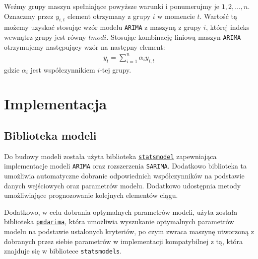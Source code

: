 \documentclass[12pt]{article}
\begin{document}
Weźmy grupy maszyn spełniające powyższe warunki i ponumerujmy je $1, 2, \dots, n$. Oznaczmy przez $y_{i,t}$ element otrzymany z grupy $i$ w momencie $t$. Wartość tą możemy uzyskać stosując wzór modelu \texttt{ARIMA} z maszyną z grupy $i$, której indeks wewnątrz grupy jest równy $t mod i$.
Stosując kombinację liniową maszyn \texttt{ARIMA} otrzymujemy następujący wzór na następny element:
\begin{gather*}
    y_t = \sum^n_{i=1}\alpha_iy_{i,t}
\end{gather*}
gdzie $\alpha_i$ jest współczynnikiem $i$-tej grupy.

\section{Implementacja}

\subsection{Biblioteka modeli}

Do budowy modeli została użyta biblioteka \href{https://www.statsmodels.org/stable/index.html}{\texttt{statsmodel}} zapewniająca implementacje modeli \texttt{ARIMA} oraz rozszerzenia \texttt{SARIMA}. Dodatkowo biblioteka ta umożliwia automatyczne dobranie odpowiednich współczynników na podstawie danych wejściowych oraz parametrów modelu. Dodatkowo udostępnia metody umożliwiające prognozowanie kolejnych elementów ciągu.

Dodatkowo, w celu dobrania optymalnych parametrów modeli, użyta została biblioteka \href{https://alkaline-ml.com/pmdarima/}{\texttt{pmdarima}}, która umożliwia wyszukanie optymalnych parametrów modelu na podstawie ustalonych kryteriów, po czym zwraca maszynę utworzoną z dobranych przez siebie parametrów w implementacji kompatybilnej z tą, która znajduje się w bibliotece \texttt{statsmodels}.
\end{document}
